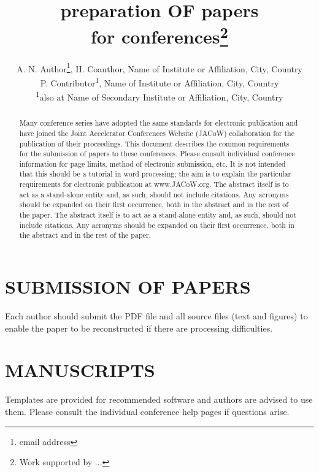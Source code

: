 \documentclass[a4paper,
               nospread,     %
               ]{jacow}
\begin{document}
\title{preparation OF papers\\ for  conferences\thanks{Work supported by ...}}

\author{A. N. Author\thanks{email address}, H. Coauthor, Name of Institute or Affiliation, City, Country \\
		P. Contributor\textsuperscript{1}, Name of Institute or Affiliation, City, Country \\
		\textsuperscript{1}also at Name of Secondary Institute or Affiliation, City, Country}
	
\maketitle

\begin{abstract}
   Many conference series have adopted the same standards
   for electronic publication and have joined the Joint
   Accelerator Conferences Website (JACoW) collaboration
   for the publication of their proceedings. This document
   describes the common requirements for the submission of
   papers to these conferences. Please consult individual
   conference information for page limits, method of electronic
   submission, etc. It is not intended that this should
   be a tutorial in word processing; the aim is to explain the
   particular requirements for electronic publication at
   www.JACoW.org. The abstract itself is to act as a stand-alone
   entity and, as such, should not include citations. Any acronyms 
   should be expanded on their first occurrence, both in the 
   abstract and in the rest of the paper. 
   The abstract itself is to act as a stand-alone entity and, 
   as such, should not include citations. Any acronyms should 
   be expanded on their first occurrence, both in the abstract 
   and in the rest of the paper.
\end{abstract}


\section{SUBMISSION OF PAPERS}
Each author should submit the PDF file and all source
files (text and figures) to enable the paper to be
reconstructed if there are processing difficulties.

\section{MANUSCRIPTS}
Templates are provided for recommended software and
authors are advised to use them. Please consult the
individual conference help pages if questions arise.
\end{document}
